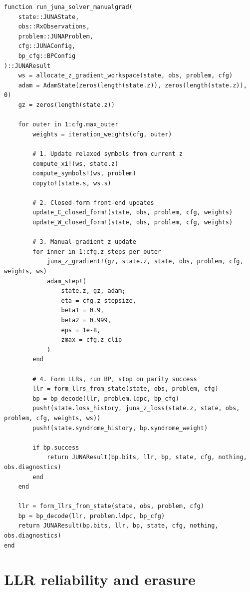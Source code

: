 \documentclass[11pt]{article}
\begin{document}
\begin{lstlisting}
function run_juna_solver_manualgrad(
    state::JUNAState,
    obs::RxObservations,
    problem::JUNAProblem,
    cfg::JUNAConfig,
    bp_cfg::BPConfig
)::JUNAResult
    ws = allocate_z_gradient_workspace(state, obs, problem, cfg)
    adam = AdamState(zeros(length(state.z)), zeros(length(state.z)), 0)
    gz = zeros(length(state.z))

    for outer in 1:cfg.max_outer
        weights = iteration_weights(cfg, outer)

        # 1. Update relaxed symbols from current z
        compute_xi!(ws, state.z)
        compute_symbols!(ws, problem)
        copyto!(state.s, ws.s)

        # 2. Closed-form front-end updates
        update_C_closed_form!(state, obs, problem, cfg, weights)
        update_W_closed_form!(state, obs, problem, cfg, weights)

        # 3. Manual-gradient z update
        for inner in 1:cfg.z_steps_per_outer
            juna_z_gradient!(gz, state.z, state, obs, problem, cfg, weights, ws)
            adam_step!(
                state.z, gz, adam;
                eta = cfg.z_stepsize,
                beta1 = 0.9,
                beta2 = 0.999,
                eps = 1e-8,
                zmax = cfg.z_clip
            )
        end

        # 4. Form LLRs, run BP, stop on parity success
        llr = form_llrs_from_state(state, obs, problem, cfg)
        bp = bp_decode(llr, problem.ldpc, bp_cfg)
        push!(state.loss_history, juna_z_loss(state.z, state, obs, problem, cfg, weights, ws))
        push!(state.syndrome_history, bp.syndrome_weight)

        if bp.success
            return JUNAResult(bp.bits, llr, bp, state, cfg, nothing, obs.diagnostics)
        end
    end

    llr = form_llrs_from_state(state, obs, problem, cfg)
    bp = bp_decode(llr, problem.ldpc, bp_cfg)
    return JUNAResult(bp.bits, llr, bp, state, cfg, nothing, obs.diagnostics)
end
\end{lstlisting}

\section{LLR reliability and erasure}
\end{document}
